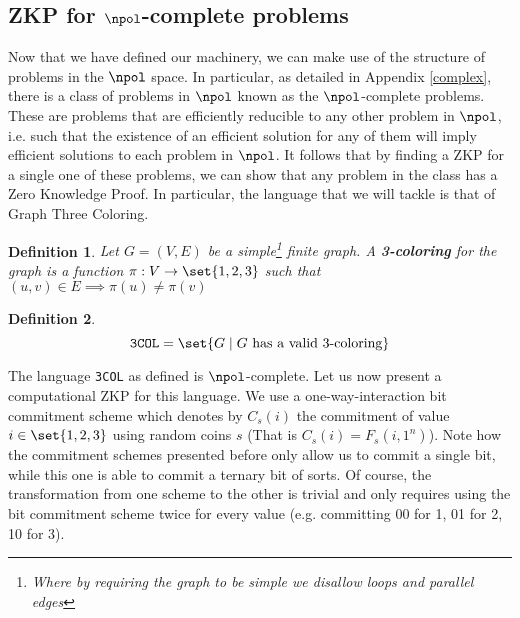 \documentclass{article}
\newtheorem{definition}{Definition}
\begin{document}
\subsection{ZKP for \texorpdfstring{$\npol$}{NP}-complete problems}
\label{np}
Now that we have defined our machinery, we can make use of the structure of problems in the $\npol$ space.
In particular, as detailed in Appendix \ref{complex}, there is a class of problems in $\npol$ known as the $\npol$-complete problems.
These are problems that are efficiently reducible to any other problem in $\npol$, i.e. such that the existence of an efficient solution for any of them will imply efficient solutions to each problem in $\npol$.
It follows that by finding a ZKP for a single one of these problems, we can show that any problem in the class has a Zero Knowledge Proof.
In particular, the language that we will tackle is that of Graph Three Coloring.
\begin{definition}
    Let $G = (V, E)$ be a simple\footnote{Where by requiring the graph to be simple we disallow loops and parallel edges} finite graph. A \textbf{3-coloring} for the graph is a function $\pi: V \to \set{1, 2, 3}$
    such that $(u, v) \in E \implies \pi(u) \neq \pi(v)$
\end{definition}
\begin{definition}
    \[ \texttt{3COL} = \set{ G \; | \; G \text{ has a valid 3-coloring} } \]
\end{definition}
The language \texttt{3COL} as defined is $\npol$-complete.
Let us now present a computational ZKP \cite{goldreichProofsThatYield1991} \cite{goldreichMethodologyCryptographicProtocol} for this language. We use a one-way-interaction bit commitment scheme which denotes by
$C_s(i)$ the commitment of value $i \in \set{1, 2, 3}$ using random coins $s$ (That is $C_s(i) = F_s(i, 1^n)$). Note how the commitment schemes
presented before only allow us to commit a single bit, while this one is able to commit a ternary bit of sorts. Of course, the transformation
from one scheme to the other is trivial and only requires using the bit commitment scheme twice for every value (e.g. committing 00 for 1, 01 for 2, 10 for 3).
\end{document}
